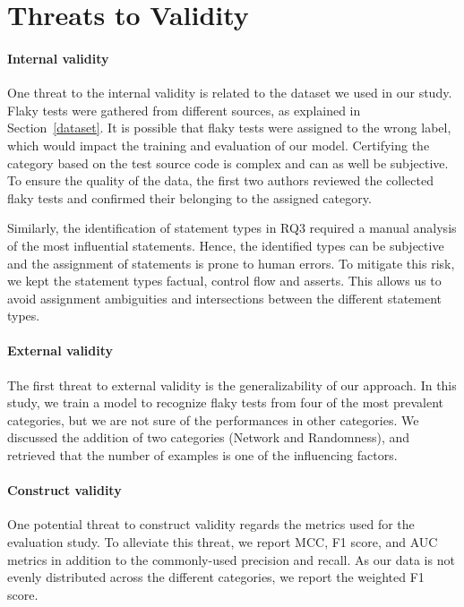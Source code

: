 \section{Threats to Validity}
\label{sec:flakycat-threats}

\paragraph{Internal validity}
One threat to the internal validity is related to the dataset we used in our study. Flaky tests were gathered from different sources, as explained in Section~\ref{dataset}. It is possible that flaky tests were assigned to the wrong label, which would impact the training and evaluation of our model. Certifying the category based on the test source code is complex and can as well be subjective. To ensure the quality of the data, the first two authors reviewed the collected flaky tests and confirmed their belonging to the assigned category.

Similarly, the identification of statement types in RQ3 required a manual analysis of the most influential statements. 
Hence, the identified types can be subjective and the assignment of statements is prone to human errors.
To mitigate this risk, we kept the statement types factual, \eg control flow and asserts.
This allows us to avoid assignment ambiguities and intersections between the different statement types.
\paragraph{External validity}
The first threat to external validity is the generalizability of our approach. In this study, we train a model to recognize flaky tests from four of the most prevalent categories, but we are not sure of the performances in other categories. We discussed the addition of two categories (Network and Randomness), and retrieved that the number of examples is one of the influencing factors. 

\paragraph{Construct validity}
One potential threat to construct validity regards the metrics used for the evaluation study. To alleviate this threat, we report MCC, F1 score, and AUC metrics in addition to the commonly-used precision and recall. As our data is not evenly distributed across the different categories, we report the weighted F1 score.

